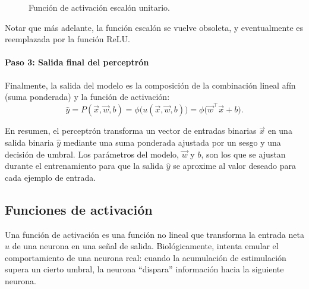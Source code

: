 \begin{figure}[H]
\centering
{}
\caption{Función de activación escalón unitario.}
\label{fig:escalon}
\end{figure}

  Notar que más adelante, la función escalón se vuelve obsoleta, y eventualmente es reemplazada por la función ReLU.

\paragraph{Paso 3: Salida final del perceptrón}
Finalmente, la salida del modelo es la composición de la combinación lineal afín (suma ponderada) y la función de activación:
\begin{equation}
\label{eq:perceptron-y}
\hat{y} = P(\vec{x}, \vec{w}, b) = \phi\bigl( u(\vec{x}, \vec{w}, b) \bigr) 
= \phi\bigl( \vec{w}^\top \vec{x} + b \bigr).
\end{equation}

En resumen, el perceptrón transforma un vector de entradas binarias $\vec{x}$ en una salida binaria $\hat{y}$ mediante una suma ponderada ajustada por un sesgo y una decisión de umbral. Los parámetros del modelo, $\vec{w}$ y $b$, son los que se ajustan durante el entrenamiento para que la salida $\hat{y}$ se aproxime al valor deseado para cada ejemplo de entrada.

\subsection{Funciones de activación}

Una función de activación es una función no lineal que transforma la entrada neta $u$ de una neurona en una señal de salida. Biológicamente, intenta emular el comportamiento de una neurona real: cuando la acumulación de estimulación supera un cierto umbral, la neurona ``dispara'' información hacia la siguiente neurona.


